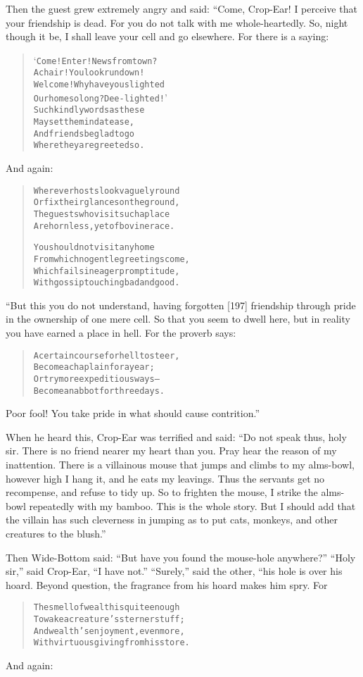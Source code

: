 \documentclass[article, twoside, 14pt]{memoir}
\renewenvironment{verbatim}{%
\begin{quote}%
\vskip -10pt%
\begin{alltt}\normalfont\large}{\end{alltt}%
\end{quote}%
\vskip -10pt
} %
\begin{document}
Then the guest grew extremely angry and said: “Come, Crop-Ear! I
perceive that your friendship is dead. For you do not talk with me
whole-heartedly. So, night though it be, I shall leave your cell
and go elsewhere. For there is a saying:

\begin{verbatim}
‘Come! Enter! News from town?
A chair! You look run down!
Welcome! Why have you slighted
Our home so long? Dee-lighted!’
Such kindly words as these
May set the mind at ease,
And friends be glad to go
Where they are greeted so.
\end{verbatim}
And again:

\begin{verbatim}
Wherever hosts look vaguely round
Or fix their glances on the ground,
The guests who visit such a place
Are hornless, yet of bovine race.

You should not visit any home
From which no gentle greetings come,
Which fails in eager promptitude,
With gossip touching bad and good.
\end{verbatim}
“But this you do not understand, having forgotten [197] friendship
through pride in the ownership of one mere cell. So that you seem
to dwell here, but in reality you have earned a place in hell. For
the proverb says:

\begin{verbatim}
A certain course for hell to steer,
Become a chaplain for a year;
Or try more expeditious ways--
Become an abbot for three days.
\end{verbatim}
Poor fool! You take pride in what should cause contrition.”

When he heard this, Crop-Ear was terrified and said:
``Do not speak thus, holy sir. There is no friend nearer my heart than you. Pray hear the reason of my inattention. There is a villainous mouse that jumps and climbs to my alms-bowl, however high I hang it, and he eats my leavings. Thus the servants get no recompense, and refuse to tidy up. So to frighten the mouse, I strike the alms-bowl repeatedly with my bamboo. This is the whole story. But I should add that the villain has such cleverness in jumping as to put cats, monkeys, and other creatures to the blush.''

Then Wide-Bottom said:
``But have you found the mouse-hole anywhere?'' ``Holy sir,'' said
Crop-Ear, ``I have not.'' ``Surely,'' said the other, “his hole is
over his hoard. Beyond question, the fragrance from his hoard makes
him spry. For

\begin{verbatim}
The smell of wealth is quite enough
To wake a creature's sterner stuff;
And wealth's enjoyment, even more,
With virtuous giving from his store.
\end{verbatim}
And again:
\end{document}
